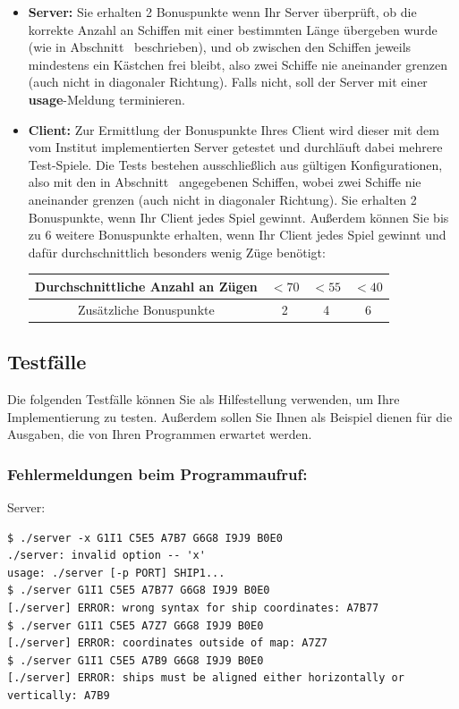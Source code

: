 \begin{itemize}
    \item \textbf{Server:} Sie erhalten 2 Bonuspunkte wenn Ihr Server überprüft,
    ob die korrekte Anzahl an Schiffen mit einer bestimmten Länge übergeben wurde (wie in Abschnitt~ beschrieben),
    und ob zwischen den Schiffen jeweils mindestens ein Kästchen frei bleibt, also zwei Schiffe nie aneinander grenzen
    (auch nicht in diagonaler Richtung). Falls nicht, soll der Server mit einer \textbf{usage}-Meldung terminieren.
    \item \textbf{Client:} Zur Ermittlung der Bonuspunkte Ihres Client wird dieser mit dem vom Institut implementierten Server getestet
    und durchläuft dabei mehrere Test-Spiele. Die Tests bestehen ausschließlich aus gültigen Konfigurationen,
    also mit den in Abschnitt~ angegebenen Schiffen,
    wobei zwei Schiffe nie aneinander grenzen (auch nicht in diagonaler Richtung).
    Sie erhalten 2 Bonuspunkte, wenn Ihr Client jedes Spiel gewinnt.
    Außerdem können Sie bis zu 6 weitere Bonuspunkte erhalten,
    wenn Ihr Client jedes Spiel gewinnt und dafür durchschnittlich besonders wenig Züge benötigt:

    \vspace{3pt}
    {\centering
    \begin{tabular}{| c | c | c | c |}
    \hline
    Durchschnittliche Anzahl an Zügen & $<70$ & $<55$ & $<40$ \\
    \hline
    Zusätzliche Bonuspunkte & 2 & 4 & 6 \\
    \hline
    \end{tabular} \par
    }
\end{itemize}

\subsection*{Testfälle}
\label{sec:testcases}

Die folgenden Testfälle können Sie als Hilfestellung verwenden, um Ihre Implementierung zu testen.
Außerdem sollen Sie Ihnen als Beispiel dienen für die Ausgaben, die von Ihren Programmen erwartet werden.

\subsubsection*{Fehlermeldungen beim Programmaufruf:}
\vspace{-10pt}
Server:
\vspace{-10pt}
\begin{verbatim}
$ ./server -x G1I1 C5E5 A7B7 G6G8 I9J9 B0E0
./server: invalid option -- 'x'
usage: ./server [-p PORT] SHIP1...
$ ./server G1I1 C5E5 A7B77 G6G8 I9J9 B0E0
[./server] ERROR: wrong syntax for ship coordinates: A7B77
$ ./server G1I1 C5E5 A7Z7 G6G8 I9J9 B0E0
[./server] ERROR: coordinates outside of map: A7Z7
$ ./server G1I1 C5E5 A7B9 G6G8 I9J9 B0E0
[./server] ERROR: ships must be aligned either horizontally or vertically: A7B9
\end{verbatim}

